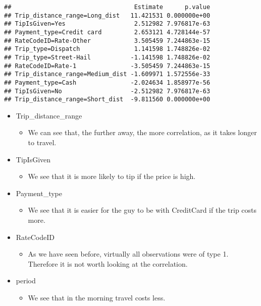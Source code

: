 \documentclass[
  18pt,
  a4paper]{article}
\newenvironment{Shaded}{\begin{snugshade}}{\end{snugshade}}
\newcommand{\CommentTok}[1]{\textcolor[rgb]{0.56,0.35,0.01}{\textit{#1}}}
\newcommand{\NormalTok}[1]{#1}
\newcommand{\OperatorTok}[1]{\textcolor[rgb]{0.81,0.36,0.00}{\textbf{#1}}}
\providecommand{\tightlist}{%
  \setlength{\itemsep}{0pt}\setlength{\parskip}{0pt}}
\begin{document}
\begin{Shaded}
\end{Shaded}

\begin{verbatim}
##                                  Estimate      p.value
## Trip_distance_range=Long_dist   11.421531 0.000000e+00
## TipIsGiven=Yes                   2.512982 7.976817e-63
## Payment_type=Credit card         2.653121 4.728144e-57
## RateCodeID=Rate-Other            3.505459 7.244863e-15
## Trip_type=Dispatch               1.141598 1.748826e-02
## Trip_type=Street-Hail           -1.141598 1.748826e-02
## RateCodeID=Rate-1               -3.505459 7.244863e-15
## Trip_distance_range=Medium_dist -1.609971 1.572556e-33
## Payment_type=Cash               -2.024634 1.858977e-56
## TipIsGiven=No                   -2.512982 7.976817e-63
## Trip_distance_range=Short_dist  -9.811560 0.000000e+00
\end{verbatim}

\begin{itemize}
\tightlist
\item
  Trip\_distance\_range

  \begin{itemize}
  \tightlist
  \item
    We can see that, the further away, the more correlation, as it takes
    longer to travel.
  \end{itemize}
\item
  TipIsGiven

  \begin{itemize}
  \tightlist
  \item
    We see that it is more likely to tip if the price is high.
  \end{itemize}
\item
  Payment\_type

  \begin{itemize}
  \tightlist
  \item
    We see that it is easier for the guy to be with CreditCard if the
    trip costs more.
  \end{itemize}
\item
  RateCodeID

  \begin{itemize}
  \tightlist
  \item
    As we have seen before, virtually all observations were of type 1.
    Therefore it is not worth looking at the correlation.
  \end{itemize}
\item
  period

  \begin{itemize}
  \tightlist
  \item
    We see that in the morning travel costs less.
  \end{itemize}
\end{itemize}
\end{document}
